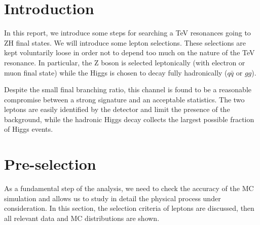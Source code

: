\documentclass[12pt]{article} %
\begin{document}

\tableofcontents %

\newpage %



\section{Introduction} %

In this report, we introduce some steps for searching a TeV resonances going to ZH final states. We will introduce some lepton selections. These selections are kept voluntarily loose in order not to depend too much on the nature of the TeV resonance. In particular, the Z boson is selected leptonically (with electron or muon final state) while the Higgs is chosen to decay fully hadronically ($q\bar{q}$ or $gg$).

Despite the small final branching ratio, this channel is found to be a reasonable compromise between a strong signature and an acceptable statistics. The two leptons are easily identified by the detector and limit the presence of the background, while the hadronic Higgs decay collects the largest possible fraction of Higgs events. 

\newpage



\section{Pre-selection} %

As a fundamental step of the analysis, we need to check the accuracy of the MC simulation and allows us to study in detail the physical process under consideration. In this section, the selection criteria of leptons are discussed, then all relevant data and MC distributions are shown.
\end{document}
